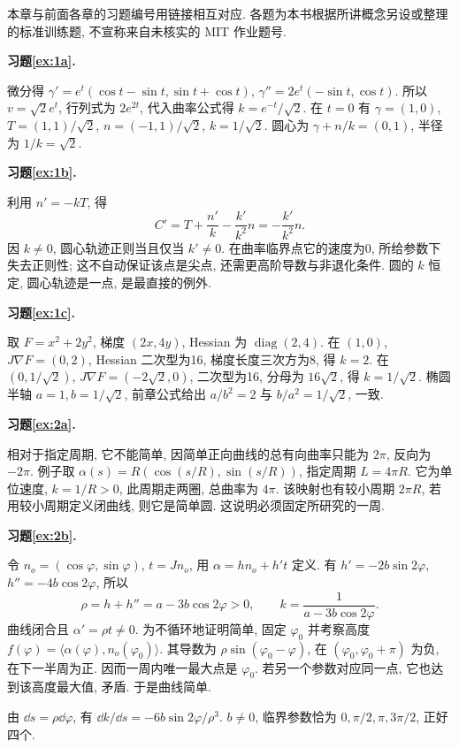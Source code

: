 \par{}
本章与前面各章的习题编号用链接相互对应. 各题为本书根据所讲概念另设或整理的标准训练题, 不宣称来自未核实的 MIT 作业题号.
\par{}
\par{}
\noindent\textbf{习题\ref{ex:1a}.}
\begin{solution}
微分得 $\gamma'=e^t(\cos t-\sin t,\sin t+\cos t)$, $\gamma''=2e^t(-\sin t,\cos t)$. 所以 $v=\sqrt2e^t$, 行列式为 $2e^{2t}$, 代入曲率公式得 $k=e^{-t}/\sqrt2$. 在 $t=0$ 有 $\gamma=(1,0)$, $T=(1,1)/\sqrt2$, $n=(-1,1)/\sqrt2$, $k=1/\sqrt2$. 圆心为 $\gamma+n/k=(0,1)$, 半径为 $1/k=\sqrt2$.
\end{solution}
\par{}
\noindent\textbf{习题\ref{ex:1b}.}
\begin{solution}
利用 $n'=-kT$, 得
\[
 C'=T+\frac{n'}k-\frac{k'}{k^2}n=-\frac{k'}{k^2}n.
\]
因 $k\ne0$, 圆心轨迹正则当且仅当 $k'\ne0$. 在曲率临界点它的速度为0, 所给参数下失去正则性; 这不自动保证该点是尖点, 还需更高阶导数与非退化条件. 圆的 $k$ 恒定, 圆心轨迹是一点, 是最直接的例外.
\end{solution}
\par{}
\noindent\textbf{习题\ref{ex:1c}.}
\begin{solution}
取 $F=x^2+2y^2$, 梯度 $(2x,4y)$, Hessian 为 $\operatorname{diag}(2,4)$. 在 $(1,0)$, $J\nabla F=(0,2)$, Hessian 二次型为16, 梯度长度三次方为8, 得 $k=2$. 在 $(0,1/\sqrt2)$, $J\nabla F=(-2\sqrt2,0)$, 二次型为16, 分母为 $16\sqrt2$, 得 $k=1/\sqrt2$. 椭圆半轴 $a=1,b=1/\sqrt2$, 前章公式给出 $a/b^2=2$ 与 $b/a^2=1/\sqrt2$, 一致.
\end{solution}
\par{}
\par{}
\noindent\textbf{习题\ref{ex:2a}.}
\begin{solution}
相对于指定周期, 它不能简单, 因简单正向曲线的总有向曲率只能为 $2\pi$, 反向为 $-2\pi$. 例子取 $\alpha(s)=R(\cos(s/R),\sin(s/R))$, 指定周期 $L=4\pi R$. 它为单位速度, $k=1/R>0$, 此周期走两圈, 总曲率为 $4\pi$. 该映射也有较小周期 $2\pi R$, 若用较小周期定义闭曲线, 则它是简单圆. 这说明必须固定所研究的一周.
\end{solution}
\par{}
\noindent\textbf{习题\ref{ex:2b}.}
\begin{solution}
令 $n_o=(\cos\varphi,\sin\varphi)$, $t=Jn_o$, 用 $\alpha=hn_o+h't$ 定义. 有 $h'=-2b\sin2\varphi$, $h''=-4b\cos2\varphi$, 所以
\[
 \rho=h+h''=a-3b\cos2\varphi>0,\qquad
 k=\frac1{a-3b\cos2\varphi}.
\]
曲线闭合且 $\alpha'=\rho t\ne0$. 为不循环地证明简单, 固定 $\varphi_0$ 并考察高度 $f(\varphi)=\langle\alpha(\varphi),n_o(\varphi_0)\rangle$. 其导数为 $\rho\sin(\varphi_0-\varphi)$, 在 $(\varphi_0,\varphi_0+\pi)$ 为负, 在下一半周为正. 因而一周内唯一最大点是 $\varphi_0$. 若另一个参数对应同一点, 它也达到该高度最大值, 矛盾. 于是曲线简单.

由 $\dd s=\rho\dd\varphi$, 有 $\dd k/\dd s=-6b\sin2\varphi/\rho^3$. $b\ne0$, 临界参数恰为 $0,\pi/2,\pi,3\pi/2$, 正好四个.
\end{solution}
